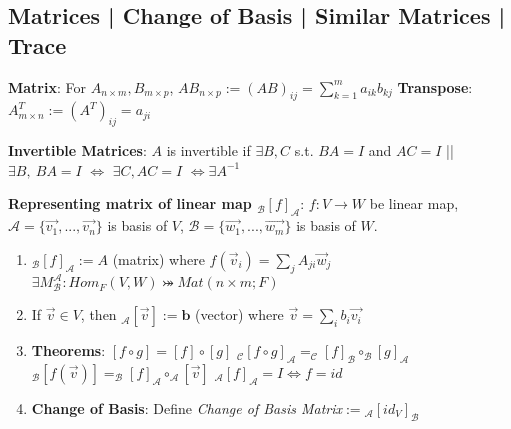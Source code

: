 \documentclass[9pt]{article}
\begin{document}
\subsection{Matrices | Change of Basis | Similar Matrices | Trace} %

\textbf{Matrix}: For $A_{n\times m},B_{m\times p}$, $AB_{n\times p}:=(AB)_{ij}=\sum_{k=1}^{m}a_{ik}b_{kj}$ \quad \textbf{Transpose}: $A^T_{m\times n}:=(A^T)_{ij}=a_{ji}$

\textbf{Invertible Matrices}: {\small $A$ is invertible if $\exists B,C$ s.t. $BA=I$ and $AC=I$ \quad || \quad $\exists B, \ BA=I$ $\Leftrightarrow$ $\exists C,AC=I$ $\Leftrightarrow \exists A^{-1}$} 

\textbf{Representing matrix of linear map $_{\mathcal{B}}[f]_{\mathcal{A}}$}: $f:V\to W$ be linear map, $\mathcal{A}=\{\vec{v_1},...,\vec{v_n}\}$ is basis of $V$, $\mathcal{B}=\{\vec{w_1},...,\vec{w_m}\}$ is basis of $W$.

\begin{enumerate}[itemsep=-2pt, topsep=-2pt]
    \item $_{\mathcal{B}}[f]_{\mathcal{A}}:=A$ {\small (matrix)} where $f(\vec{v}_{i})=\sum_{j}A_{ji}\vec{w}_j$ \quad \quad $\exists M^{\mathcal{A}}_{\mathcal{B}}:Hom_{F}(V,W)\bij Mat(n\times m;F)$
    \item If $\vec{v}\in V$, then $_{\mathcal{A}}[\vec{v}]:=\mathbf{b}$ {\small (vector)} where $\vec{v}=\sum_{i}b_i\vec{v_i}$
    \item \textbf{Theorems}: $[f\circ g]=[f]\circ[g]$ \quad \quad $_{\mathcal{C}}[f\circ g]_{\mathcal{A}}=_{\mathcal{C}}[f]_{\mathcal{B}}\circ_{\mathcal{B}}[g]_{\mathcal{A}}$ \quad \quad $_{\mathcal{B}}[f(\vec{v})]=_{\mathcal{B}}[f]_{\mathcal{A}}\circ_{\mathcal{A}}[\vec{v}]$ \quad \quad $_{\mathcal{A}}[f]_{\mathcal{A}}=I\Leftrightarrow f=id$
    \item \textbf{Change of Basis}: {\small Define \textit{Change of Basis Matrix}$:=$$_{\mathcal{A}}[id_V]_{\mathcal{B}}$ \quad {}}
\end{enumerate}
\end{document}
